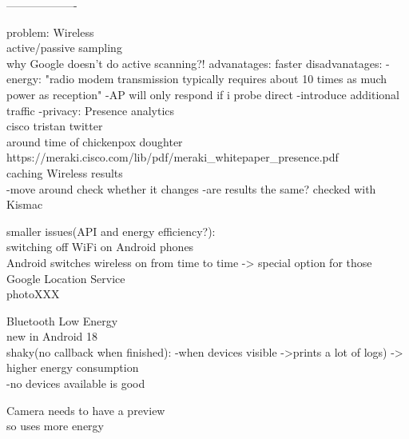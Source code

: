 -------------------

problem: Wireless\\	
	active/passive sampling\\
		why Google doesn't do active scanning?!
			advanatages: faster
			disadvanatages: 
				-energy:
					"radio modem transmission typically requires about 10 times as much power as reception"
				-AP will only respond if i probe direct 
				-introduce additional  traffic
				-privacy:
					Presence analytics\\
						cisco tristan twitter\\
							around time of chickenpox doughter\\
							https://meraki.cisco.com/lib/pdf/meraki\_whitepaper\_presence.pdf\\
				
				
	caching Wireless results\\
		-move around check whether it changes
			-are results the same?
		checked with Kismac

smaller issues(API and energy efficiency?):\\
	switching off WiFi on Android phones\\
		Android switches wireless on from time to time -> special option for those \\
			Google Location Service\\
			photoXXX
			
	Bluetooth Low Energy\\
		new in Android 18\\
		shaky(no callback when finished):
			-when devices visible ->prints a lot of logs) -> higher energy consumption\\
			-no devices available is good
		
	Camera needs to have a preview\\
		so uses more energy\\
		
